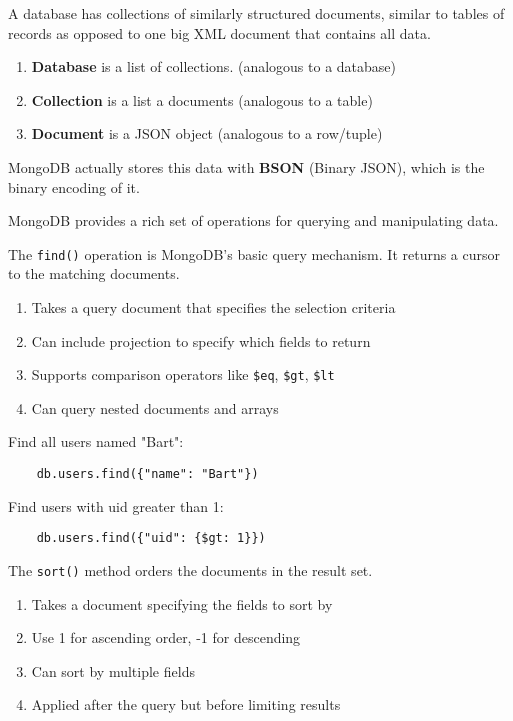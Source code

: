 \begin{definition}
  A database has collections of similarly structured documents, similar to tables of records as opposed to one big XML document that contains all data.  
  \begin{enumerate}
    \item \textbf{Database} is a list of collections. (analogous to a database)
    \item \textbf{Collection} is a list a documents (analogous to a table)
    \item \textbf{Document} is a JSON object (analogous to a row/tuple)
  \end{enumerate}
  MongoDB actually stores this data with \textbf{BSON} (Binary JSON), which is the binary encoding of it. 
\end{definition}  

MongoDB provides a rich set of operations for querying and manipulating data. 

\begin{definition}[find()]
  The \texttt{find()} operation is MongoDB's basic query mechanism. It returns a cursor to the matching documents.
  \begin{enumerate}
    \item Takes a query document that specifies the selection criteria
    \item Can include projection to specify which fields to return
    \item Supports comparison operators like \texttt{\$eq}, \texttt{\$gt}, \texttt{\$lt}
    \item Can query nested documents and arrays
  \end{enumerate}
\end{definition}

\begin{example}
  Find all users named "Bart":
  \begin{lstlisting}
    db.users.find({"name": "Bart"})
  \end{lstlisting}
  Find users with uid greater than 1:
  \begin{lstlisting}
    db.users.find({"uid": {$gt: 1}})
  \end{lstlisting}
\end{example}

\begin{definition}[sort()]
  The \texttt{sort()} method orders the documents in the result set.
  \begin{enumerate}
    \item Takes a document specifying the fields to sort by
    \item Use 1 for ascending order, -1 for descending
    \item Can sort by multiple fields
    \item Applied after the query but before limiting results
  \end{enumerate}
\end{definition}

